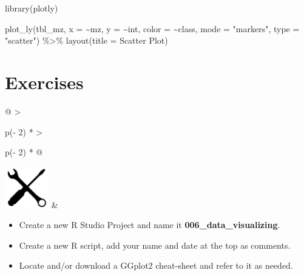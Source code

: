 \documentclass[
]{book}
\newenvironment{Shaded}{\begin{snugshade}}{\end{snugshade}}
\newcommand{\AttributeTok}[1]{\textcolor[rgb]{0.77,0.63,0.00}{#1}}
\newcommand{\FunctionTok}[1]{\textcolor[rgb]{0.00,0.00,0.00}{#1}}
\newcommand{\NormalTok}[1]{#1}
\newcommand{\SpecialCharTok}[1]{\textcolor[rgb]{0.00,0.00,0.00}{#1}}
\newcommand{\StringTok}[1]{\textcolor[rgb]{0.31,0.60,0.02}{#1}}
\begin{document}
\begin{Shaded}
\begin{Highlighting}[]
\FunctionTok{library}\NormalTok{(plotly)}
\end{Highlighting}
\end{Shaded}

\begin{Shaded}
\begin{Highlighting}[]
\FunctionTok{plot\_ly}\NormalTok{(tbl\_mz, }\AttributeTok{x =} \SpecialCharTok{\textasciitilde{}}\NormalTok{mz, }\AttributeTok{y =} \SpecialCharTok{\textasciitilde{}}\NormalTok{int, }\AttributeTok{color =} \SpecialCharTok{\textasciitilde{}}\NormalTok{class,}
        \AttributeTok{mode =} \StringTok{"markers"}\NormalTok{, }\AttributeTok{type =} \StringTok{"scatter"}\NormalTok{) }\SpecialCharTok{\%\textgreater{}\%} 
  \FunctionTok{layout}\NormalTok{(}\AttributeTok{title =} \StringTok{\textquotesingle{}Scatter Plot\textquotesingle{}}\NormalTok{)}
\end{Highlighting}
\end{Shaded}

\hypertarget{exercises-5}{%
\section*{Exercises}\label{exercises-5}}

\begin{longtable}[]{@{}
  >{\raggedright\arraybackslash}p{(\columnwidth - 2\tabcolsep) * }
  >{\raggedright\arraybackslash}p{(\columnwidth - 2\tabcolsep) * }@{}}
\toprule\noalign{}
\endhead
\bottomrule\noalign{}
\endlastfoot
\includegraphics[width=\textwidth,height=0.70833in]{images/07.png} & \begin{minipage}[t]{\linewidth}\raggedright
\begin{itemize}
\item
  Create a new R Studio Project and name it \textbf{006\_data\_visualizing}.
\item
  Create a new R script, add your name and date at the top as comments.
\item
  Locate and/or download a GGplot2 cheat-sheet and refer to it as needed.
\end{itemize}
\end{minipage} \\
\end{longtable}
\end{document}
